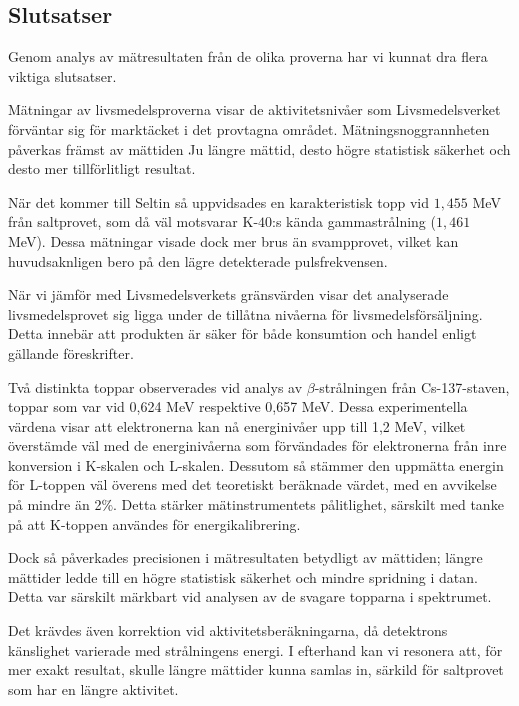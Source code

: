 \subsection{Slutsatser} \label{sec:conclusions}

Genom analys av mätresultaten från de olika proverna har vi kunnat dra flera viktiga slutsatser. 

\indent

Mätningar av livsmedelsproverna visar de aktivitetsnivåer som Livsmedelsverket 
\parencite{livsmedelsverket} förväntar sig för marktäcket i det provtagna området. 
Mätningsnoggrannheten påverkas främst av mättiden Ju längre mättid, desto högre statistisk 
säkerhet och desto mer tillförlitligt resultat.

När det kommer till Seltin så uppvidsades en karakteristisk topp vid $1,455$ MeV från saltprovet,
som då väl motsvarar K-$40$:s kända gammastrålning ($1,461$ MeV).
Dessa mätningar visade dock mer brus än svampprovet, vilket kan huvudsaknligen bero på den lägre 
detekterade pulsfrekvensen.

\indent

När vi jämför med Livsmedelsverkets gränsvärden visar det analyserade livsmedelsprovet sig ligga 
under de tillåtna nivåerna för livsmedelsförsäljning. Detta innebär att produkten är säker för 
både konsumtion och handel enligt gällande föreskrifter.


Två distinkta toppar observerades vid analys av $\beta$-strålningen från Cs-137-staven, toppar som
var vid 0,624 MeV respektive 0,657 MeV. Dessa experimentella värdena visar att elektronerna kan nå
energinivåer upp till 1,2 MeV, vilket överstämde väl med de energinivåerna som förvändades för 
elektronerna från inre konversion i K-skalen och L-skalen.
Dessutom så stämmer den uppmätta energin för L-toppen väl överens med det teoretiskt beräknade 
värdet, med en avvikelse på mindre än 2$\%$. Detta stärker mätinstrumentets pålitlighet, särskilt
med tanke på att K-toppen användes för energikalibrering.

\indent

Dock så påverkades precisionen i mätresultaten betydligt av mättiden; längre mättider ledde till 
en högre statistisk säkerhet och mindre spridning i datan. Detta var särskilt märkbart vid analysen
av de svagare topparna i spektrumet.

Det krävdes även korrektion vid aktivitetsberäkningarna, då detektrons känslighet varierade med 
strålningens energi. I efterhand kan vi resonera att, för mer exakt resultat, skulle längre mättider
kunna samlas in, särkild för saltprovet som har en längre aktivitet.


